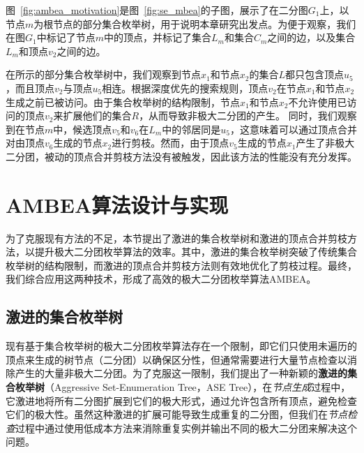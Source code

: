 \begin{example}
  图~\ref{fig:ambea_motivation}是图~\ref{fig:se_mbea}的子图，展示了在二分图$G_1$上，以节点$m$为根节点的部分集合枚举树，用于说明本章研究出发点。为便于观察，我们在图$G_1$中标记了节点$m$中的顶点，并标记了集合$L_m$和集合$C_m$之间的边，以及集合$L_m$和顶点$v_2$之间的边。

  在所示的部分集合枚举树中，我们观察到节点$x_1$和节点$x_2$的集合$L$都只包含顶点$u_5$，而且顶点$v_2$与顶点$u_5$相连。根据深度优先的搜索规则，顶点$v_2$在节点$x_1$和节点$x_2$生成之前已被访问。由于集合枚举树的结构限制，节点$x_1$和节点$x_2$不允许使用已访问的顶点$v_2$来扩展他们的集合$R$，从而导致非极大二分团的产生。
  同时，我们观察到在节点$m$中，候选顶点$v_5$和$v_6$在$L_m$中的邻居同是$u_5$，这意味着可以通过顶点合并对由顶点$v_6$生成的节点$x_2$进行剪枝。然而，由于顶点$v_5$生成的节点$x_1$产生了非极大二分团，被动的顶点合并剪枝方法没有被触发，因此该方法的性能没有充分发挥。

\end{example}

\section{AMBEA算法设计与实现}

为了克服现有方法的不足，本节提出了激进的集合枚举树和激进的顶点合并剪枝方法，以提升极大二分团枚举算法的效率。其中，激进的集合枚举树突破了传统集合枚举树的结构限制，而激进的顶点合并剪枝方法则有效地优化了剪枝过程。最终，我们综合应用这两种技术，形成了高效的极大二分团枚举算法AMBEA。

\subsection{激进的集合枚举树}
\label{subsec:ase}

现有基于集合枚举树的极大二分团枚举算法存在一个限制，即它们只使用未遍历的顶点来生成的树节点（二分团）以确保区分性，但通常需要进行大量节点检查以消除产生的大量非极大二分团。为了克服这一限制，我们提出了一种新颖的\textbf{激进的集合枚举树}（Aggressive Set-Enumeration Tree，ASE Tree），在\textit{节点生成}过程中，它激进地将所有二分图扩展到它们的极大形式，通过允许包含所有顶点，避免检查它们的极大性。虽然这种激进的扩展可能导致生成重复的二分图，但我们在\textit{节点检查}过程中通过使用低成本方法来消除重复实例并输出不同的极大二分团来解决这个问题。


